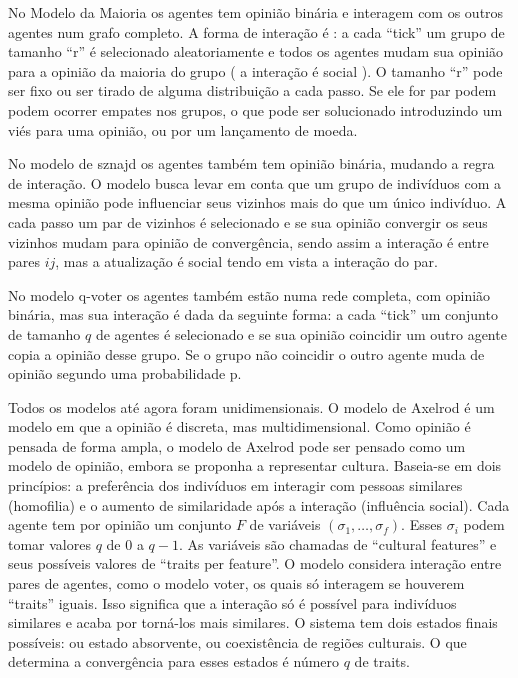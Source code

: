 No Modelo da Maioria os agentes tem opinião binária e interagem com os
outros agentes num grafo completo. A forma de interação é : a cada
``tick'' um grupo de tamanho ``r'' é selecionado aleatoriamente e
todos os agentes mudam sua opinião para a opinião da maioria do grupo
( a interação é social ). O tamanho ``r'' pode ser fixo ou ser tirado
de alguma distribuição a cada passo. Se ele for par podem podem
ocorrer empates nos grupos, o que pode ser solucionado introduzindo um
viés para uma opinião, ou por um lançamento de moeda.

No modelo de sznajd os agentes também tem opinião binária, mudando a regra de
interação. O modelo busca levar em conta que um grupo de indivíduos com a mesma
opinião pode influenciar seus vizinhos mais do que um único indivíduo. A cada
passo um par de vizinhos é selecionado e se sua opinião convergir os seus
vizinhos mudam para opinião de convergência, sendo assim a interação é entre
pares $ij$, mas a atualização é social tendo em vista a interação do par.

No modelo q-voter os agentes também estão numa rede completa, com
opinião binária, mas sua interação é dada da seguinte forma: a cada
``tick'' um conjunto de tamanho $q$ de agentes é selecionado e se sua
opinião coincidir um outro agente copia a opinião desse grupo. Se o
grupo não coincidir o outro agente muda de opinião segundo uma
probabilidade p.

Todos os modelos até agora foram unidimensionais. O modelo de Axelrod
é um modelo em que a opinião é discreta, mas multidimensional. Como
opinião é pensada de forma ampla, o modelo de Axelrod pode ser pensado
como um modelo de opinião, embora se proponha a representar
cultura. Baseia-se em dois princípios: a preferência dos indivíduos em
interagir com pessoas similares (homofilia) e o aumento de
similaridade após a interação (influência social). Cada agente tem por
opinião um conjunto $F$ de variáveis $(\sigma_1 , \ldots,
\sigma_f)$. Esses $\sigma_i$ podem tomar valores $q$ de 0 a $q-1$. As
variáveis são chamadas de ``cultural features'' e seus possíveis
valores de ``traits per feature''. O modelo considera interação entre
pares de agentes, como o modelo voter, os quais só interagem se
houverem ``traits'' iguais. Isso significa que a interação só é
possível para indivíduos similares e acaba por torná-los mais
similares. O sistema tem dois estados finais possíveis: ou estado
absorvente, ou coexistência de regiões culturais. O que determina a
convergência para esses estados é número $q$ de traits.



